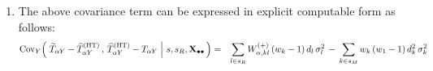 \begin{lemma}
\begin{enumerate}
\begin{eqnarray*}
{            \;\right\vert\,
            s,s_{R},\Xobs
            \,\right]}
    \end{eqnarray*}
\item
    The above covariance term can be expressed in explicit computable form as follows:
    \begin{eqnarray*}
    \textnormal{Cov}_{Y}\!\left(\,
        \left.
        \widetilde{T}_{\alpha Y} - \widehat{T}^{\textnormal{(HT)}}_{\alpha Y}
        \,,\,
        \widehat{T}^{\textnormal{(HT)}}_{\alpha Y} - T_{\alpha Y}
        \;\right\vert\,
        s,s_{R},\mathbf{X}_{\bullet\bullet}
        \,\right)
    & = &
        \underset{l \in s_{R}}{\sum}\,
            W^{(+)}_{\alpha,kl}\,(w_{k}-1)\,d_{l}\,\sigma_{l}^{2}
        \,-\,
        \underset{k \in s_{M}}{\sum}\,
            w_{k}\,(w_{1}-1)\,d_{k}^{2}\,\sigma_{k}^{2}
    \end{eqnarray*}
\end{enumerate}
\end{lemma}
\proof
